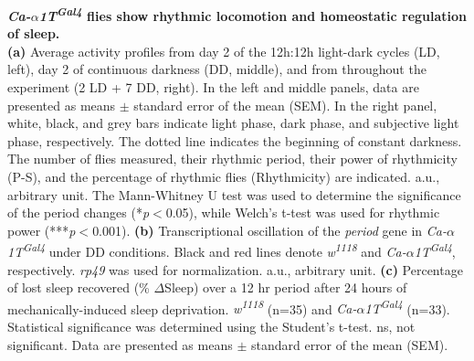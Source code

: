 \label{fig:4}
\textbf{ \emph{Ca-$\alpha$1T\textsuperscript{Gal4}} flies show rhythmic locomotion and homeostatic regulation of sleep.}
\\
\textbf{(a)} Average activity profiles from day 2 of the 12h:12h light-dark cycles (LD, left), day 2 of continuous darkness (DD, middle), and from throughout the experiment (2 LD + 7 DD, right).
In the left and middle panels, data are presented as means $\pm$ standard error of the mean (SEM).
In the right panel, white, black, and grey bars indicate light phase, dark phase, and subjective light phase, respectively.
The dotted line indicates the beginning of constant darkness. 
The number of flies measured, their rhythmic period, their power of rhythmicity (P-S), and the percentage of rhythmic flies (Rhythmicity) are indicated.
a.u., arbitrary unit.
The Mann-Whitney U test was used to determine the significance of the period changes (*\emph{p}$<$0.05), while Welch's t-test was used for rhythmic power (***\emph{p}$<$0.001). 
\textbf{(b)} Transcriptional oscillation of the \emph{period} gene in \emph{Ca-$\alpha$1T\textsuperscript{Gal4}} under DD conditions. Black and red lines denote \emph{w\textsuperscript{1118}} and \emph{Ca-$\alpha$1T\textsuperscript{Gal4}}, respectively.
\emph{rp49} was used for normalization.
a.u., arbitrary unit.
\textbf{(c)} Percentage of lost sleep recovered (\% $\Delta$Sleep) over a 12 hr period after 24 hours of mechanically-induced sleep deprivation. \emph{w\textsuperscript{1118}} (n=35) and \emph{Ca-$\alpha$1T\textsuperscript{Gal4}} (n=33). 
Statistical significance was determined using the Student's t-test. 
ns, not significant.
Data are presented as means $\pm$ standard error of the mean (SEM).
